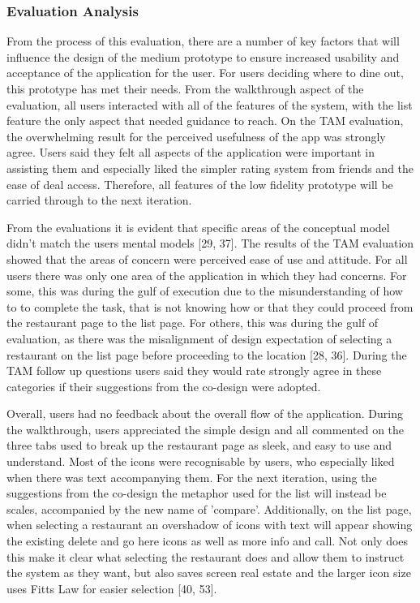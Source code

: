 \documentclass[a4 paper, 12pt]{article}
\begin{document}
\subsubsection{Evaluation Analysis}
From the process of this evaluation, there are a number of key factors that will influence the design of the medium prototype to ensure increased usability and acceptance of the application for the user. For users deciding where to dine out, this prototype has met their needs. From the walkthrough aspect of the evaluation, all users interacted with all of the features of the system, with the list feature the only aspect that needed guidance to reach. On the TAM evaluation, the overwhelming result for the perceived usefulness of the app was strongly agree. Users said they felt all aspects of the application were important in assisting them and especially liked the simpler rating system from friends and the ease of deal access. Therefore, all features of the low fidelity prototype will be carried through to the next iteration.

From the evaluations it is evident that specific areas of the conceptual model didn't match the users mental models [29, 37]. The results of the TAM evaluation showed that the areas of concern were perceived ease of use and attitude. For all users there was only one area of the application in which they had concerns. For some, this was during the gulf of execution due to the misunderstanding of how to to complete the task, that is not knowing how or that they could proceed from the restaurant page to the list page. For others, this was during the gulf of evaluation, as there was the misalignment of design expectation of selecting a restaurant on the list page before proceeding to the location [28, 36]. During the TAM follow up questions users said they would rate strongly agree in these categories if their suggestions from the co-design were adopted. 

Overall, users had no feedback about the overall flow of the application. During the walkthrough, users appreciated the simple design and all commented on the three tabs used to break up the restaurant page as sleek, and easy to use and understand. Most of the icons were recognisable by users, who especially liked when there was text accompanying them. For the next iteration, using the suggestions from the co-design the metaphor used for the list will instead be scales, accompanied by the new name of 'compare'. Additionally, on the list page, when selecting a restaurant an overshadow of icons with text will appear showing the existing delete and go here icons as well as more info and call. Not only does this make it clear what selecting the restaurant does and allow them to instruct the system as they want, but also saves screen real estate and the larger icon size uses Fitts Law for easier selection [40, 53].  
\end{document}
